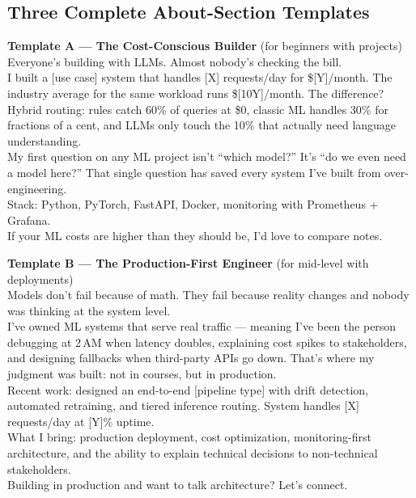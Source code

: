 \subsection{Three Complete About-Section Templates}

\begin{template}
\textbf{Template A --- The Cost-Conscious Builder} (for beginners with projects)\\[4pt]
Everyone's building with LLMs. Almost nobody's checking the bill.\\[4pt]
I built a [use case] system that handles [X] requests/day for \$[Y]/month. The industry average for the same
workload runs \$[10Y]/month. The difference? Hybrid routing: rules catch 60\% of queries at \$0, classic ML
handles 30\% for fractions of a cent, and LLMs only touch the 10\% that actually need language understanding.\\[4pt]
My first question on any ML project isn't ``which model?'' It's ``do we even need a model here?'' That single
question has saved every system I've built from over-engineering.\\[4pt]
Stack: Python, PyTorch, FastAPI, Docker, monitoring with Prometheus + Grafana.\\[4pt]
If your ML costs are higher than they should be, I'd love to compare notes.
\end{template}

\begin{template}
\textbf{Template B --- The Production-First Engineer} (for mid-level with deployments)\\[4pt]
Models don't fail because of math. They fail because reality changes and nobody was thinking at the system
level.\\[4pt]
I've owned ML systems that serve real traffic --- meaning I've been the person debugging at 2\,AM when latency
doubles, explaining cost spikes to stakeholders, and designing fallbacks when third-party APIs go down. That's
where my judgment was built: not in courses, but in production.\\[4pt]
Recent work: designed an end-to-end [pipeline type] with drift detection, automated retraining, and tiered
inference routing. System handles [X] requests/day at [Y]\% uptime.\\[4pt]
What I bring: production deployment, cost optimization, monitoring-first architecture, and the ability to explain
technical decisions to non-technical stakeholders.\\[4pt]
Building in production and want to talk architecture? Let's connect.
\end{template}

